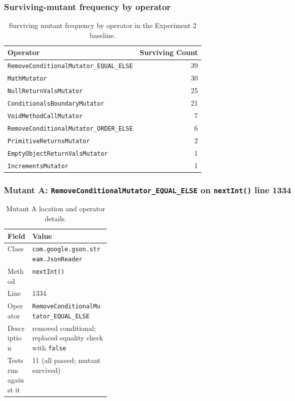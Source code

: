 \documentclass[11pt]{article}
\begin{document}
\subsubsection{Surviving-mutant frequency by operator}
\begin{table}[H]
\centering
\small
\begin{tabular}{lr}
\toprule
Operator & Surviving Count \\
\midrule
\texttt{RemoveConditionalMutator\_EQUAL\_ELSE} & 39 \\
\texttt{MathMutator} & 30 \\
\texttt{NullReturnValsMutator} & 25 \\
\texttt{ConditionalsBoundaryMutator} & 21 \\
\texttt{VoidMethodCallMutator} & 7 \\
\texttt{RemoveConditionalMutator\_ORDER\_ELSE} & 6 \\
\texttt{PrimitiveReturnsMutator} & 2 \\
\texttt{EmptyObjectReturnValsMutator} & 1 \\
\texttt{IncrementsMutator} & 1 \\
\bottomrule
\end{tabular}
\caption{Surviving mutant frequency by operator in the Experiment 2 baseline.}
\end{table}

\subsubsection{Mutant A: \texttt{RemoveConditionalMutator\_EQUAL\_ELSE} on \texttt{nextInt()} line 1334}
\begin{table}[H]
\centering
\small
\begin{tabularx}{\linewidth}{>{\raggedright\arraybackslash}p{0.24\linewidth}X}
\toprule
Field & Value \\
\midrule
Class & \texttt{com.google.gson.stream.JsonReader} \\
Method & \texttt{nextInt()} \\
Line & 1334 \\
Operator & \texttt{RemoveConditionalMutator\_EQUAL\_ELSE} \\
Description & removed conditional; replaced equality check with \texttt{false} \\
Tests run against it & 11 (all passed; mutant survived) \\
\bottomrule
\end{tabularx}
\caption{Mutant A location and operator details.}
\end{table}
\end{document}
